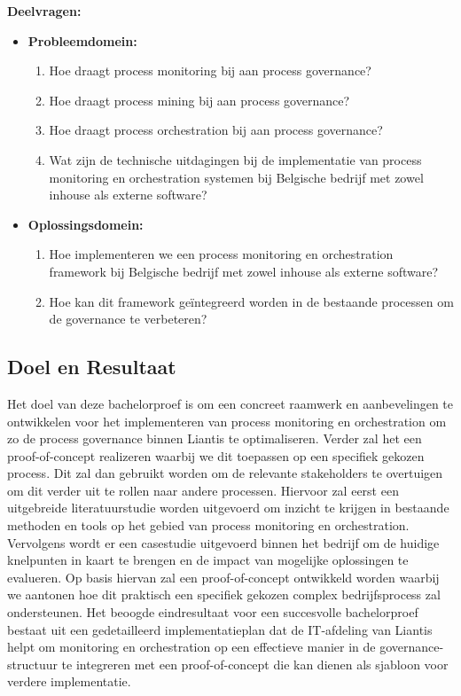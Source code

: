 \textbf{Deelvragen:}
\begin{itemize}
    \item \textbf{Probleemdomein:}
    \begin{enumerate}
        \item Hoe draagt process monitoring bij aan process governance?
        \item Hoe draagt process mining bij aan process governance?
        \item Hoe draagt process orchestration bij aan process governance?
        \item Wat zijn de technische uitdagingen bij de implementatie van process monitoring en orchestration systemen bij Belgische bedrijf met zowel inhouse als externe software?
    \end{enumerate}
    
    \item \textbf{Oplossingsdomein:}
    \begin{enumerate}
        \item Hoe implementeren we een process monitoring en orchestration framework bij Belgische bedrijf met zowel inhouse als externe software?
        \item Hoe kan dit framework geïntegreerd worden in de bestaande processen om de governance te verbeteren?
    \end{enumerate}
\end{itemize}

\subsection{Doel en Resultaat}

Het doel van deze bachelorproef is om een concreet raamwerk en aanbevelingen te ontwikkelen voor het implementeren van process monitoring en orchestration om zo de process governance binnen Liantis te optimaliseren. Verder zal het een proof-of-concept realizeren waarbij we dit toepassen op een specifiek gekozen process. Dit zal dan gebruikt worden om de relevante stakeholders te overtuigen om dit verder uit te rollen naar andere processen.  Hiervoor zal eerst een uitgebreide literatuurstudie worden uitgevoerd om inzicht te krijgen in bestaande methoden en tools op het gebied van process monitoring en orchestration. Vervolgens wordt er een casestudie uitgevoerd binnen het bedrijf om de huidige knelpunten in kaart te brengen en de impact van mogelijke oplossingen te evalueren. Op basis hiervan zal een proof-of-concept ontwikkeld worden waarbij we aantonen hoe dit praktisch een specifiek gekozen complex bedrijfsprocess zal ondersteunen. Het beoogde eindresultaat voor een succesvolle bachelorproef bestaat uit een gedetailleerd implementatieplan dat de IT-afdeling van Liantis helpt om monitoring en orchestration op een effectieve manier in de governance-structuur te integreren met een proof-of-concept die kan dienen als sjabloon voor verdere implementatie. 

